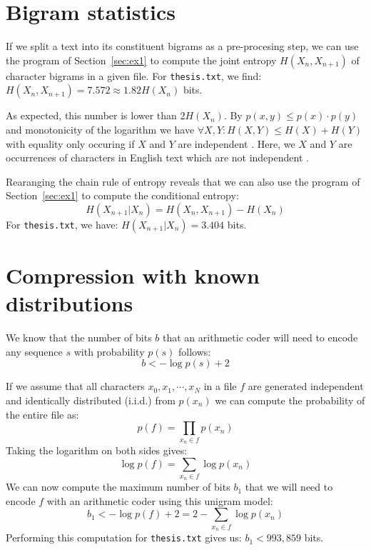 \documentclass[10pt,a4paper,oneside,onecolumn]{article}
\newcommand*{\thesisTXT}{{\tt thesis.txt}\xspace}
\newcommand*{\iid}{i.i.d.\xspace}
\begin{document}
\section{Bigram statistics}\label{sec:ex2}

If we split a text into its constituent bigrams as a pre-procesing step, we can
use the program of Section~\ref{sec:ex1} to compute the joint entropy $H(X_n,
X_{n+1})$ of character bigrams in a given file. For \thesisTXT, we
find: $H(X_n, X_{n+1}) = 7.572 \approx 1.82H(X_n)$ bits.\footnotemark
{}

As expected, this number is lower than $2H(X_n)$. By $p(x,y) \le p(x) \cdot
p(y)$ and monotonicity of the logarithm we have $\forall X,Y: H(X, Y) \le H(X) +
H(Y)$ with equality only occuring if $X$ and $Y$ are independent
\cite[p.~138]{mackay}. Here, we $X$ and $Y$ are occurrences of characters in
English text which are not independent \cite[p.~22-24]{mackay}.

Rearanging the chain rule of entropy \cite[p.~139]{mackay} reveals that we can
also use the program of Section~\ref{sec:ex1} to compute the conditional
entropy:
\begin{equation}
    H(X_{n+1} | X_n) = H(X_n, X_{n+1}) - H(X_n)
\end{equation}
For \thesisTXT, we have: $H(X_{n+1} | X_n) = 3.404$ bits.


\section{Compression with known distributions}\label{sec:ex3}

We know \cite[p.~21]{it4} that the number of bits $b$ that an arithmetic coder
will need to encode any sequence $s$ with probability $p(s)$ follows:
\begin{equation}
    b < -\log p(s) + 2
\end{equation}

If we assume that all characters $x_0, x_1, \cdots, x_N$ in a file $f$ are
generated independent and identically distributed (\iid) from $p(x_n)$ we can
compute the probability of the entire file as:
\begin{equation}
    p(f) = \prod\limits_{x_n \in f} p(x_n)
\end{equation}
Taking the logarithm on both sides gives:
\begin{equation}\label{eq:unigram-logprob}
    \log p(f) = \sum\limits_{x_n \in f} \log p(x_n)
\end{equation}
We can now compute the maximum number of bits $b_1$ that we will need to encode
$f$ with an arithmetic coder using this unigram model:
\begin{equation}\label{eq:unigram-nbits}
    b_1 < -\log p(f) + 2 = 2 - \sum\limits_{x_n \in f} \log p(x_n)
\end{equation}
Performing this computation for \thesisTXT gives us: $b_1 < 993,859$ bits.
\end{document}
